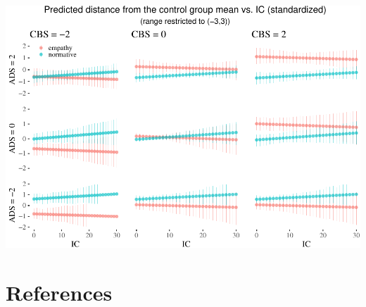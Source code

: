 \documentclass[10pt,dvipsnames,enabledeprecatedfontcommands]{scrartcl}
\begin{document}
\begin{center}\includegraphics[width=1\linewidth]{bayesianReport_files/figure-latex/unnamed-chunk-17-1} \end{center}

\normalsize

\section*{References}\label{references}

\vspace{-3mm}
\end{document}
